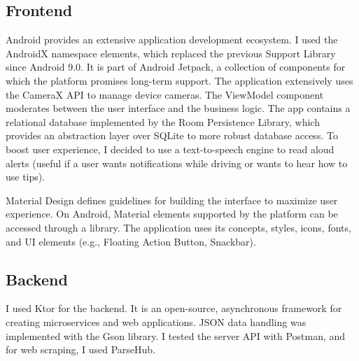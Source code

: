 \subsection{Frontend}

Android provides an extensive application development ecosystem. I used the AndroidX namespace elements, which replaced the previous Support Library since Android 9.0. It is part of Android Jetpack, a collection of components for which the platform promises long-term support. The application extensively uses the CameraX API to manage device cameras. The ViewModel component moderates between the user interface and the business logic. The app contains a relational database implemented by the Room Persistence Library, which provides an abstraction layer over SQLite to more robust database access. To boost user experience, I decided to use a text-to-speech engine to read aloud alerts (useful if a user wants notifications while driving or wants to hear how to use tips).

Material Design defines guidelines for building the interface to maximize user experience. On Android, Material elements supported by the platform can be accessed through a library. The application uses its concepts, styles, icons, fonts, and UI elements (e.g., Floating Action Button, Snackbar).

\subsection{Backend}

I used Ktor\cite{Ktor} for the backend. It is an open-source, asynchronous framework for creating microservices and web applications. JSON data handling was implemented with the Gson library. I tested the server API with Postman, and for web scraping, I used ParseHub.

